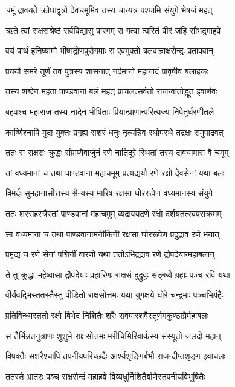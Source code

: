 \twolineshloka
{चमूं द्रावयते क्रोधाद्वृत्रो देवचमूमिव}
{तस्य चान्यत्र पश्यामि संयुगे भेषजं महत्}


\twolineshloka
{ऋते त्वां राक्षसश्रेष्ठं सर्वविद्यासु पारगम्}
{स गत्वा त्वरितं वीरं जहि सौभद्रमाहवे}


\twolineshloka
{वयं पार्थं हनिष्यामो भीष्मद्रोणपुरोगमाः}
{स एवमुक्तो बलवान्राक्षसेन्द्रः प्रतापवान्}


\twolineshloka
{प्रययौ समरे तूर्णं तव पुत्रस्य शासनात्}
{नर्दमानो महानादं प्रावृषीव बलाहकः}


\twolineshloka
{तस्य शब्देन महता पाण्डवानां बलं महत्}
{प्राचलत्सर्वतो राजन्वातोद्धूत इवार्णवः}


\twolineshloka
{बहवश्च महाराज तस्य नादेन भीषिताः}
{प्रियान्प्राणान्परित्यज्य निपेतुर्धरणीतले}


\twolineshloka
{कार्ष्णिश्चापि मुदा युक्तः प्रगृह्य सशरं धनुः}
{नृत्यन्निव रथोपस्थे तद्रक्षः समुपाद्रवत्}


\twolineshloka
{ततः स राक्षसः क्रुद्धः संप्राप्यैवार्जुनं रणे}
{नातिदूरे स्थितां तस्य द्रावयामास वै चमूम्}


\twolineshloka
{तां वध्यमानां च तथा पाण्डवानां महाचमूम्}
{प्रत्यद्ययौ रणे रक्षो देवसेनां यथा बलः}


\twolineshloka
{विमर्दः सुमहानासीत्तस्य सैन्यस्य मारिष}
{रक्षसा घोररूपेण वध्यमानस्य संयुगे}


\twolineshloka
{ततः शरसहस्त्रैस्तां पाण्डवानां महाचमूम्}
{व्यद्रावयद्रणे रक्षो दर्शयतत्स्वपराक्रमम्}


\twolineshloka
{सा वध्यमाना च तथा पाण्डवानामनीकिनी}
{रक्षसा घोररूपेण प्रदुद्राव रणे भयात्}


\twolineshloka
{प्रमृद्य च रणे सेनां पद्मिनीं वारणो यथा}
{ततोऽभिद्रद्राव रणे द्रौपदेयान्महाबलान्}


\twolineshloka
{ते तु क्रुद्धा महेष्वासा द्रौपदेयाः प्रहारिणः}
{राक्षसं दुद्रुवुः सङ्ख्ये ग्रहाः पञ्च रविं यथा}


\twolineshloka
{वीर्यवद्भिस्ततस्तैस्तु पीडितो राक्षसोत्तमः}
{यथा युगक्षये घोरे चन्द्रमाः पञ्चभिर्ग्रहैः}


\twolineshloka
{प्रतिविन्ध्यस्ततो रक्षो बिभेद निशितैः शरैः}
{सर्वपारशवैस्तूर्णमकुण्ठाग्रैर्महाबलः}


\twolineshloka
{स तैर्भिन्नतनुत्राणः शुशुभे राक्षसोत्तमः}
{मरीचिभिरिवार्कस्य संस्यूतो जलदो महान्}


\twolineshloka
{विषक्तैः सशरैश्चापि तपनीयपरिच्छदैः}
{आर्श्यशृङ्गिर्बभौ राजन्दीप्तशृङ्ग इवाचलः}


\threelineshloka
{ततस्ते भ्रातरः पञ्च राक्षसेन्द्रं महाहवे}
{विव्यधुर्निशितैर्बाणैस्तपनीयविभूषितैः}
{}



